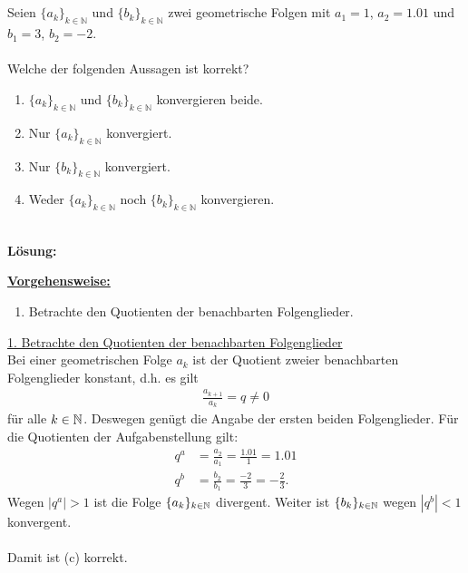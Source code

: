 \subsection*{}
Seien $\{a_k\}_{k \in \mathbb{N}}$ und $\{b_k\}_{k \in \mathbb{N}}$ zwei geometrische Folgen mit $a_1 = 1$, $a_2= 1.01$ und $b_1 = 3$, $b_2 = -2$.\\
\\
Welche der folgenden Aussagen ist korrekt? 
\renewcommand{\labelenumi}{(\alph{enumi})}
\begin{enumerate}
	\item 
	$\{a_k\}_{k \in \mathbb{N}}$ und $\{b_k\}_{k \in \mathbb{N}}$ konvergieren beide.
	\item 
	Nur $\{a_k\}_{k \in \mathbb{N}}$ konvergiert.
	\item 
	Nur $\{b_k\}_{k \in \mathbb{N}}$ konvergiert.
	\item
	Weder $\{a_k\}_{k \in \mathbb{N}}$ noch $\{b_k\}_{k \in \mathbb{N}}$ konvergieren.
\end{enumerate}
\ \\
\textbf{Lösung:}
\begin{mdframed}
\underline{\textbf{Vorgehensweise:}}
\renewcommand{\labelenumi}{\theenumi.}
\begin{enumerate}
\item Betrachte den Quotienten der benachbarten Folgenglieder.
\end{enumerate}
\end{mdframed}

\underline{1. Betrachte den Quotienten der benachbarten Folgenglieder}\\
Bei einer geometrischen Folge $a_k$ ist der Quotient zweier benachbarten Folgenglieder konstant, d.h. es gilt
\begin{align*}
	\frac{a_{k+1}}{a_k} = q \neq 0
\end{align*}
für alle $k \in \mathbb{N}$. Deswegen genügt die Angabe der ersten beiden Folgenglieder.
Für die Quotienten der Aufgabenstellung gilt:
\begin{align*}
	q^a &= \frac{a_2}{a_1} = \frac{1.01}{1} = 1.01\\
	q^b &= \frac{b_2}{b_1} = \frac{-2}{3} = - \frac{2}{3}.
\end{align*}
Wegen $\left|q^a\right| > 1$ ist die Folge $\{a_k\}_{k \in \mathbb{N}}$ divergent. Weiter ist $\{b_k\}_{k \in \mathbb{N}}$ wegen $\left|q^b\right| < 1$ konvergent.\\
\\
Damit ist (c) korrekt.



